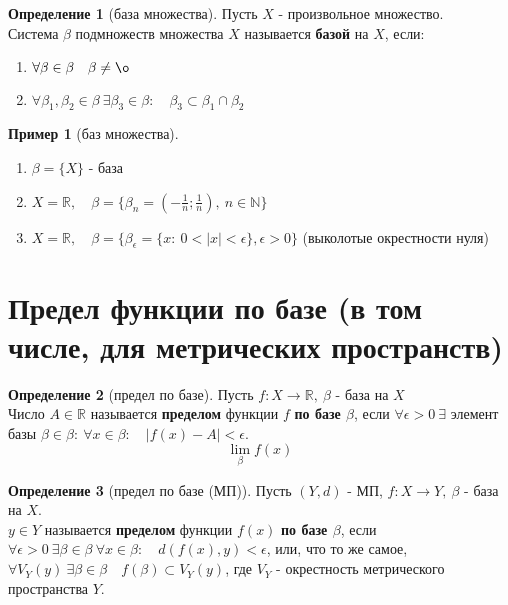 \documentclass{report}
\theoremstyle{definition}
\newtheorem*{definition}{Определение}
\newtheorem*{example}{Пример}
\begin{document}
\begin{definition}[база множества]
    Пусть $X$ - произвольное множество.\\

    Система $\beta$ подмножеств множества $X$ называется \textbf{базой} на $X$, если:
    \begin{enumerate}
        \item $\forall \beta \in \beta \quad \beta \ne \o$
        \item $\forall \beta_{1}, \beta_{2} \in \beta \ \exists \beta_{3} \in \beta: \quad \beta_{3} \subset \beta_{1}
                  \cap \beta_{2}$
    \end{enumerate}
\end{definition}

\begin{example}[баз множества]
    \begin{enumerate}
        \item $\beta = \{X\}$ - база
        \item $X = \mathbb{R}, \quad \beta = \{\beta_{n} = (-\frac{1}{n};\frac{1}{n}), \ n \in \mathbb{N}\}$
        \item $X = \mathbb{R}, \quad \beta = \{\beta_{\epsilon} = \{x: \  0 < |x| < \epsilon\}, \epsilon > 0\}$
              (выколотые окрестности нуля)
    \end{enumerate}
\end{example}

\section{Предел функции по базе (в том числе, для метрических пространств)}

\begin{definition}[предел по базе]
    Пусть $f:X\rightarrow\mathbb{R}, \ \beta$ - база на $X$\\

    Число $A\in\mathbb{R}$ называется \textbf{пределом} функции $f$ \textbf{по базе $\beta$}, если
    $\forall \epsilon > 0 \ \exists$ элемент базы $\beta \in \beta: \ \forall x \in \beta: \quad |f(x) - A| < \epsilon$.
    \begin{equation*}
        \underset{\beta}{\lim} f(x)
    \end{equation*}
\end{definition}

\begin{definition}[предел по базе (МП)]
    Пусть $(Y, d)$ - МП, $f:X\rightarrow Y, \ \beta$ - база на $X$.\\

    $y\in Y$ называется \textbf{пределом} функции $f(x)$ \textbf{по базе $\beta$}, если $\forall \epsilon > 0 \
        \exists \beta \in \beta \ \forall x \in \beta: \quad d(f(x), y) < \epsilon$, или, что то же самое,
    $\forall V_{Y}(y) \ \exists \beta \in \beta \quad f(\beta) \subset V_{Y}(y)$, где $V_{Y}$ - окрестность
    метрического пространства $Y$.
\end{definition}
\end{document}
